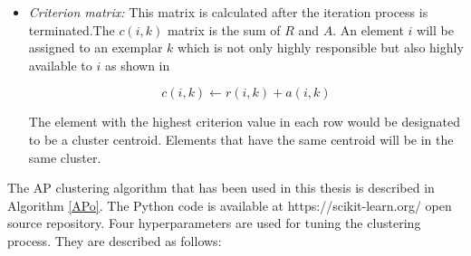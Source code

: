 \begin{itemize}
  \item\textit{Criterion matrix:} This matrix is calculated after the iteration process is terminated.The $c (i,k)$ matrix is the sum of $R$ and $A$. An element $i$ will be assigned to an exemplar $k$ which is not only highly responsible but also highly available to $i$  as shown in 
    
    \begin{equation}
        c(i, k) \leftarrow r(i, k) + a(i, k)
    \end{equation}
    
  

The element with the highest criterion value in each row would be designated to be a cluster centroid. Elements that have the same centroid will be in the same cluster.







\end{itemize}

The AP clustering algorithm that has been used in this thesis is described in Algorithm \ref{APo}. The Python code is available at https://scikit-learn.org/ open source repository. Four hyperparameters are used for tuning the clustering process. They are described as follows: 


